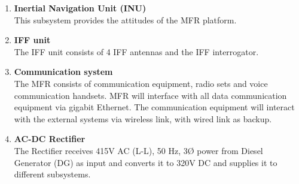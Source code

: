 \documentclass[14pt]{article} %
\begin{document}
\begin{enumerate}
\item \textbf {Inertial Navigation Unit (INU)}
\\	This subsystem provides the attitudes of the MFR platform.

\item \textbf {IFF unit}
\\	The IFF unit consists of 4 IFF antennas and the IFF interrogator.

\item \textbf {Communication system}
\\       The MFR consists of communication equipment, radio sets and voice communication handsets. MFR will interface with all data communication equipment via gigabit Ethernet. The communication equipment will interact with the external systems via wireless link, with wired link as backup.
	
\item \textbf {AC-DC Rectifier}
\\     The Rectifier receives 415V AC (L-L), 50 Hz, 3Ø power from Diesel Generator (DG) as input and converts it to 320V DC and supplies it to different subsystems.

\end{enumerate}
\end{document}
